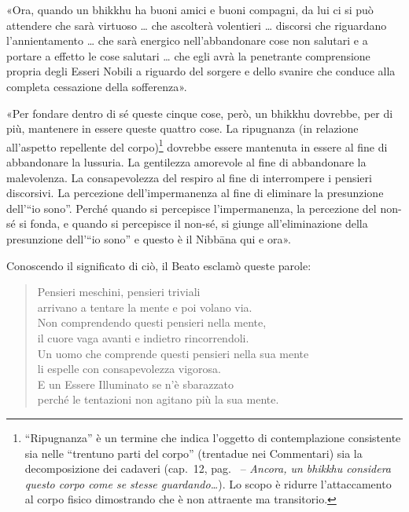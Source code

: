 «Ora, quando un bhikkhu ha buoni amici e buoni compagni, da lui ci si può
attendere che sarà virtuoso … che ascolterà volentieri … discorsi che riguardano
l’annientamento … che sarà energico nell’abbandonare cose non salutari e a
portare a effetto le cose salutari … che egli avrà la penetrante comprensione
propria degli Esseri Nobili a riguardo del sorgere e dello svanire che conduce
alla completa cessazione della sofferenza».

«Per fondare dentro di sé queste cinque cose, però, un bhikkhu dovrebbe, per di
più, mantenere in essere queste quattro cose. La ripugnanza (in relazione
all’aspetto repellente del corpo)\footnote{%
  “Ripugnanza” è un termine che indica l’oggetto di contemplazione consistente
  sia nelle “trentuno parti del corpo” (trentadue nei Commentari) sia la
  decomposizione dei cadaveri (cap.~12, pag.~\pageref{pag270} -- \emph{Ancora,
    un bhikkhu considera questo corpo come se stesse guardando\ldots}). Lo scopo
  è ridurre l’attaccamento al corpo fisico dimostrando che è non attraente ma
  transitorio.}
dovrebbe essere mantenuta in essere al fine di abbandonare la lussuria. La
gentilezza amorevole al fine di abbandonare la malevolenza. La consapevolezza
del respiro al fine di interrompere i pensieri discorsivi. La percezione
dell’impermanenza al fine di eliminare la presunzione dell’“io sono”. Perché
quando si percepisce l’impermanenza, la percezione del non-sé si fonda, e quando
si percepisce il non-sé, si giunge all’eliminazione della presunzione dell’“io
sono” e questo è il Nibbāna qui e ora».

Conoscendo il significato di ciò, il Beato esclamò queste parole:

\begin{quote}
Pensieri meschini, pensieri triviali \\
arrivano a tentare la mente e poi volano via. \\
Non comprendendo questi pensieri nella mente, \\
il cuore vaga avanti e indietro rincorrendoli. \\
Un uomo che comprende questi pensieri nella sua mente \\
li espelle con consapevolezza vigorosa. \\
E un Essere Illuminato se n’è sbarazzato \\
perché le tentazioni non agitano più la sua mente.
\end{quote}



